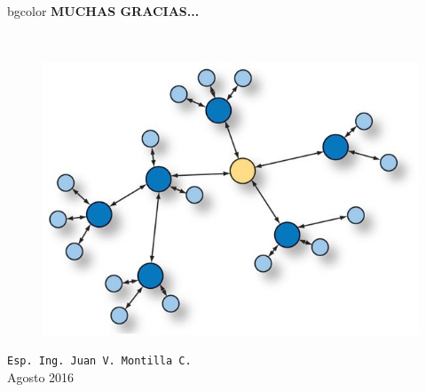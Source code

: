 \documentclass[aspectratio=43, handout]{beamer}
\begin{document}
\begin{frame}
\begin{center}
\hfill
    \begin{beamercolorbox}[center,dp=3ex,ht=10.25ex, wd=1\linewidth]{bgcolor}
        \Large\textbf{MUCHAS GRACIAS...}\\
    \end{beamercolorbox}
\hfill\hfill
\\
\vspace{5px}

\vspace{10px}


\vspace{10px}

\begin{figure}[H]
	\includegraphics[width=.3\textwidth]{./imagenes/red.jpg}
\end{figure}	
\vspace{10px}
\texttt{Esp. Ing. Juan V. Montilla C.}\\

\vspace{5px}
\tiny Agosto 2016 
 	  	
\end{center}
\end{frame}

\endgroup
\end{document}
